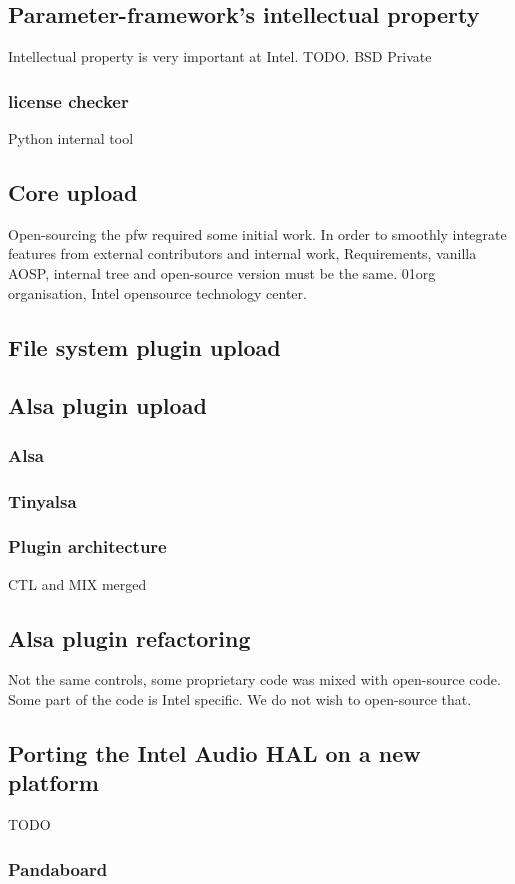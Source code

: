 \subsection{Parameter-framework's intellectual property}
Intellectual property is very important at Intel. TODO.
BSD
Private
\subsubsection{license checker}
Python internal tool

\subsection{Core upload}
Open-sourcing the \gls{pfw} required some initial work.
In order to smoothly integrate features from external contributors and internal work,
Requirements, vanilla AOSP, internal tree and open-source version must be the
same.
01org organisation, Intel opensource technology center.


\subsection{File system plugin upload}

\subsection{Alsa plugin upload}
\subsubsection{Alsa}
\subsubsection{Tinyalsa}
\subsubsection{Plugin architecture}
CTL and MIX merged

\subsection{Alsa plugin refactoring}
Not the same controls, some proprietary code was mixed with open-source code.
Some part of the code is Intel specific. We do not wish to open-source that.

\subsection{Porting the Intel Audio HAL on a new platform}
TODO
\subsubsection{Pandaboard}

